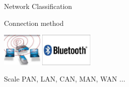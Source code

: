 \begin{frame}{Network Classification}
\begin{block}{Connection method}
\begin{center}
{      \includegraphics[height=1.6cm]{wlan}\quad
      \includegraphics[height=1.6cm]{bluz}}
    \end{center}
  \end{block}
\end{frame}

\begin{frame}
  \begin{block}{Scale}
      \small{PAN}, \large{LAN}, \Large{CAN}, \LARGE{MAN}, \Huge{WAN} ...
  \end{block}
\end{frame}

